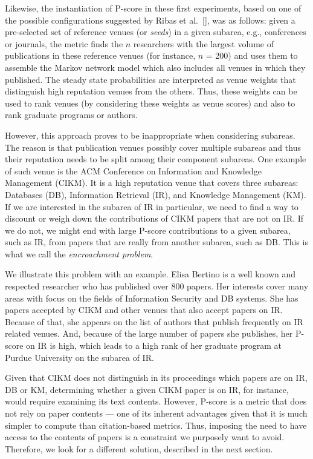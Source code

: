 \documentclass[msc]{ppgccufmg}
\begin{document}
Likewise, the instantiation of P-score in these first experiments, based on one of the possible configurations suggested by Ribas et al.~[\citeyear{ribas2015random}], was as follows: given a pre-selected set of reference venues (or \textit{seeds}) in a given subarea, e.g., conferences or journals, the metric finds the $n$ researchers with the largest volume of publications in these reference venues (for instance, $n$ = 200) and uses them to assemble the Markov network model which also includes all venues in which they published. The steady state probabilities are interpreted as venue weights that distinguish high reputation venues from the others. Thus, these weights can be used to rank venues (by considering these weights as venue scores) and also to rank graduate programs or authors.

However, this approach proves to be inappropriate when considering subareas. The reason is that publication venues possibly cover multiple subareas and thus their reputation needs to be split among their component subareas. One example of such venue is the ACM Conference on Information and Knowledge Management (CIKM). It is a high reputation venue that covers three subareas: Databases (DB), Information Retrieval (IR), and Knowledge Management (KM). If we are interested in the subarea of IR in particular, we need to find a way to discount or weigh down the contributions of CIKM papers that are not on IR. If we do not, we might end with large P-score contributions to a given subarea, such as IR, from papers that are really from another subarea, such as DB. This is what we call the \textit{encroachment problem}. 

We illustrate this problem with an example. Elisa Bertino is a well known and respected researcher who has published over 800 papers. Her interests cover many areas with focus on the fields of Information Security and DB systems. She has papers accepted by CIKM and other venues that also accept papers on IR. Because of that, she appears on the list of authors that publish frequently on IR related venues. And, because of the large number of papers she publishes, her P-score on IR is high, which leads to a high rank of her graduate program at Purdue University on the subarea of IR.

Given that CIKM does not distinguish in its proceedings which papers are on IR, DB or KM, determining whether a given CIKM paper is on IR, for instance, would require examining its text contents. However, P-score is a metric that does not rely on paper contents --- one of its inherent advantages given that it is much simpler to compute than citation-based metrics. Thus, imposing the need to have access to the contents of papers is a constraint we purposely want to avoid. Therefore, we look for a different solution, described in the next section.
\end{document}
